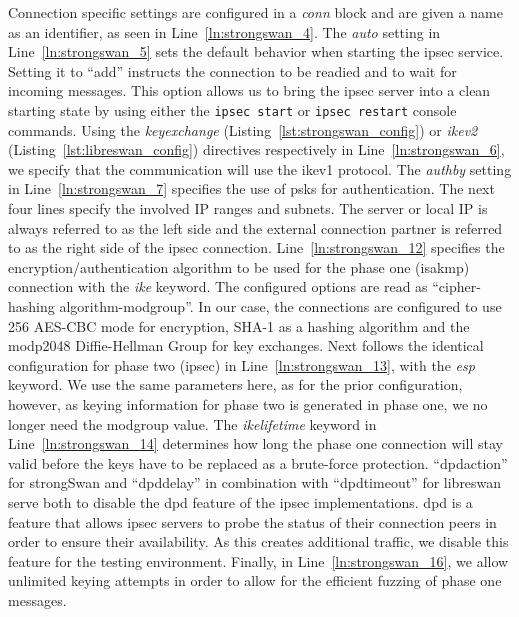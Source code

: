 Connection specific settings are configured in a \emph{conn} block and are given a name as an identifier, as seen in Line~\ref{ln:strongswan_4}. The \emph{auto} setting in Line~\ref{ln:strongswan_5} sets the default behavior when starting the \ac{ipsec} service. Setting it to ``add'' instructs the connection to be readied and to wait for incoming messages. This option allows us to bring the \ac{ipsec} server into a clean starting state by using either the \texttt{ipsec start} or \texttt{ipsec restart} console commands. Using the \emph{keyexchange} (Listing~\ref{lst:strongswan_config}) or 
\emph{ikev2} (Listing~\ref{lst:libreswan_config}) directives respectively in Line~\ref{ln:strongswan_6}, we specify that the communication will use the \ac{ike}v1 protocol. The \emph{authby} setting in Line~\ref{ln:strongswan_7} specifies the use of \acp{psk} for authentication. The next four lines specify the involved IP ranges and subnets. The server or local IP is always referred to as the left side and the external connection partner is referred to as the right side of the \ac{ipsec} connection. Line~\ref{ln:strongswan_12} specifies the encryption/authentication algorithm to be used for the phase one (\ac{isakmp}) connection with the \emph{ike} keyword. The configured options are read as ``cipher-hashing algorithm-modgroup''. In our case, the connections are configured to use \SI{256}{\bit} AES-CBC mode for encryption, SHA-1 as a hashing algorithm and the modp2048 Diffie-Hellman Group for key exchanges. Next follows the identical configuration for phase two (\ac{ipsec}) in Line~\ref{ln:strongswan_13}, with the \emph{esp} keyword. We use the same parameters here, as for the prior configuration, however, as keying information for phase two is generated in phase one, we no longer need the modgroup value. The \emph{ikelifetime} keyword in Line~\ref{ln:strongswan_14} determines how long the phase one connection will stay valid before the keys have to be replaced as a brute-force protection. ``dpdaction'' for strongSwan and ``dpddelay'' in combination with ``dpdtimeout'' for libreswan serve both to disable the \ac{dpd} feature of the \ac{ipsec} implementations. \ac{dpd} is a feature that allows \ac{ipsec} servers to probe the status of their connection peers in order to ensure their availability. As this creates additional traffic, we disable this feature for the testing environment. Finally, in Line~\ref{ln:strongswan_16}, we allow unlimited keying attempts in order to allow for the efficient fuzzing of phase one messages. \\

